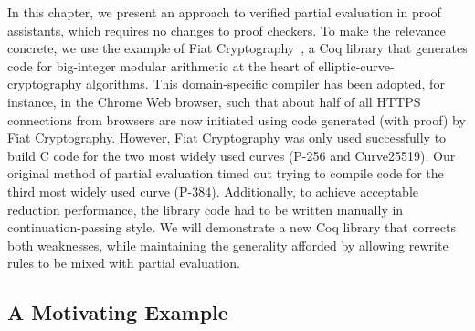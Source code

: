 In this chapter, we present an approach to verified partial evaluation in proof assistants, which requires no changes to proof checkers.
To make the relevance concrete, we use the example of Fiat Cryptography~\cite{FiatCryptoSP19}, a Coq library that generates code for big-integer modular arithmetic at the heart of elliptic-curve-cryptography algorithms.
This domain-specific compiler has been adopted, for instance, in the Chrome Web browser, such that about half of all HTTPS connections from browsers are now initiated using code generated (with proof) by Fiat Cryptography.
However, Fiat Cryptography was only used successfully to build C code for the two most widely used curves (P-256 and Curve25519).
Our original method of partial evaluation timed out trying to compile code for the third most widely used curve (P-384).
Additionally, to achieve acceptable reduction performance, the library code had to be written manually in continuation-passing style.
\label{sec:rewriting:fiat-crypto-CPS}%
We will demonstrate a new Coq library that corrects both weaknesses, while maintaining the generality afforded by allowing rewrite rules to be mixed with partial evaluation.

\subsection{A Motivating Example}\label{sec:motivating-example}\label{sec:explain-ident.eagerly}\label{sec:explain-eval-rect}\label{sec:explain-'}

